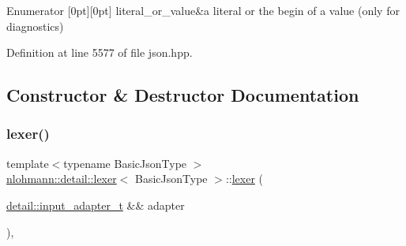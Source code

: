 \begin{DoxyEnumFields}{Enumerator}
[0pt][0pt]{}\mbox{\label{classnlohmann_1_1detail_1_1lexer_a3f313cdbe187cababfc5e06f0b69b098ad2a8e6f6721cccec0b466301dd9495a5}} 
literal\+\_\+or\+\_\+value&a literal or the begin of a value (only for diagnostics) \\
\hline

\end{DoxyEnumFields}


Definition at line 5577 of file json.\+hpp.



\subsection{Constructor \& Destructor Documentation}
\mbox{\label{classnlohmann_1_1detail_1_1lexer_ab6818e0fc05f4a52c65aeb967dd79919}} 
\subsubsection{\texorpdfstring{lexer()}{lexer()}\hspace{0.1cm}{\footnotesize\ttfamily [1/3]}}
{\footnotesize\ttfamily template$<$typename Basic\+Json\+Type $>$ \\
\mbox{\hyperlink{classnlohmann_1_1detail_1_1lexer}{nlohmann\+::detail\+::lexer}}$<$ Basic\+Json\+Type $>$\+::\mbox{\hyperlink{classnlohmann_1_1detail_1_1lexer}{lexer}} (\begin{DoxyParamCaption}\item[{\mbox{\hyperlink{namespacenlohmann_1_1detail_ae132f8cd5bb24c5e9b40ad0eafedf1c2}{detail\+::input\+\_\+adapter\+\_\+t}} \&\&}]{adapter }\end{DoxyParamCaption})\hspace{0.3cm}{\ttfamily [inline]}, {\ttfamily [explicit]}}



